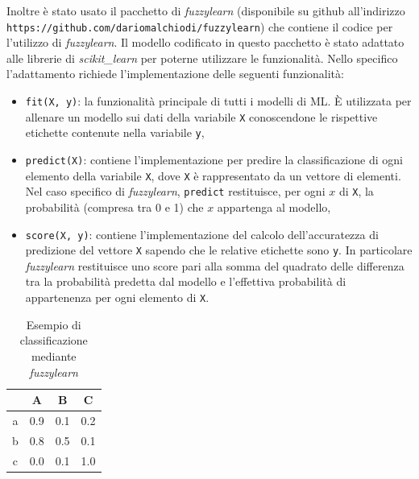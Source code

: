\documentclass[12pt,italian]{report}
\begin{document}
Inoltre è stato usato il pacchetto di \emph{fuzzylearn} (disponibile su github all'indirizzo \texttt{https://github.com/dariomalchiodi/fuzzylearn}) che contiene il codice per l'utilizzo di \emph{fuzzylearn}. Il modello codificato in questo pacchetto è stato adattato alle librerie di \emph{scikit\_learn} per poterne utilizzare le funzionalità. Nello specifico l'adattamento richiede l'implementazione delle seguenti funzionalità:
\begin{itemize}
\item{\texttt{fit(X, y)}: la funzionalità principale di tutti i modelli di ML. È utilizzata per allenare un modello sui dati della variabile \texttt{X} conoscendone le rispettive etichette contenute nella variabile \texttt{y},}
\item{\texttt{predict(X)}: contiene l'implementazione per predire la classificazione di ogni elemento della variabile \texttt{X}, dove \texttt{X} è rappresentato da un vettore di elementi. Nel caso specifico di \emph{fuzzylearn}, \texttt{predict} restituisce, per ogni $x$ di \texttt{X}, la probabilità (compresa tra 0 e 1) che $x$ appartenga al modello,}
\item{\texttt{score(X, y)}: contiene l'implementazione del calcolo dell'accuratezza di predizione del vettore \texttt{X} sapendo che le relative etichette sono \texttt{y}. In particolare \emph{fuzzylearn} restituisce uno score pari alla somma del quadrato delle differenza tra la probabilità predetta dal modello e l'effettiva probabilità di appartenenza per ogni elemento di \texttt{X}.}
\end{itemize}
\begin{table}[h!]
	\centering

		\begin{tabular}{c|c|c|c}
			& A   & B   & \multicolumn{1}{c}{C} \\ \hline
			\multicolumn{1}{c|}{a} & 0.9 & 0.1 & 0.2                    \\
			\multicolumn{1}{c|}{b} & 0.8 & 0.5 & 0.1                    \\
			\multicolumn{1}{c|}{c} & 0.0 & 0.1 & 1.0                    \\ 
		\end{tabular}%
	\caption{Esempio di classificazione mediante \emph{fuzzylearn}}
	\label{tab:example_classification}
\end{table}
\end{document}
